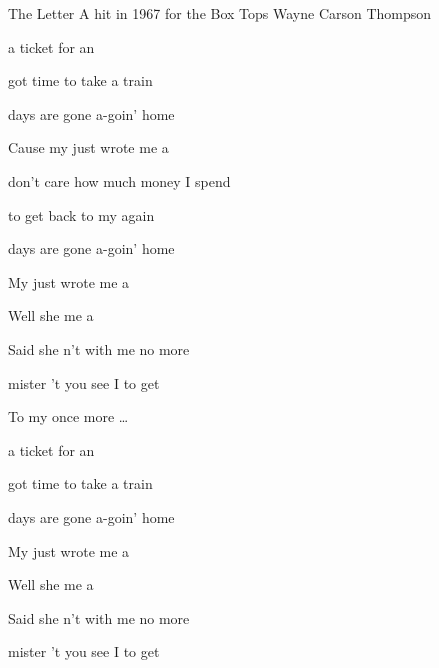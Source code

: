 \begin{SBSong}{The Letter}
  {A hit in 1967 for the Box Tops}
  {Wayne Carson Thompson}
  \begin{SBVerse}   
     a ticket for an  
    
     got time to take a  train 
    
     days are gone  a-goin' home
 
    Cause my  just wrote me a   
  \end{SBVerse}
  \begin{SBVerse}
     don't care how much money I  spend 
    
     to get back to my  again 
    
     days are gone  a-goin' home 
    
    My  just wrote me a  
  \end{SBVerse}
  
  \begin{SBVerse}
    Well she  me a  
    
    Said she n't  with me no more 
    
     mister 't you see I  to get  
    
    To my  once more \ldots 
  \end{SBVerse}
  \begin{SBVerse}
     a ticket for an  
    
     got time to take a  train 
    
     days are gone  a-goin' home 
    
    My  just wrote me a   
  \end{SBVerse}
  \begin{SBVerse}
    Well she  me a  
    
    Said she n't  with me no more 
    
     mister 't you see I  to get  
    

\end{SBVerse}
\end{SBSong}
